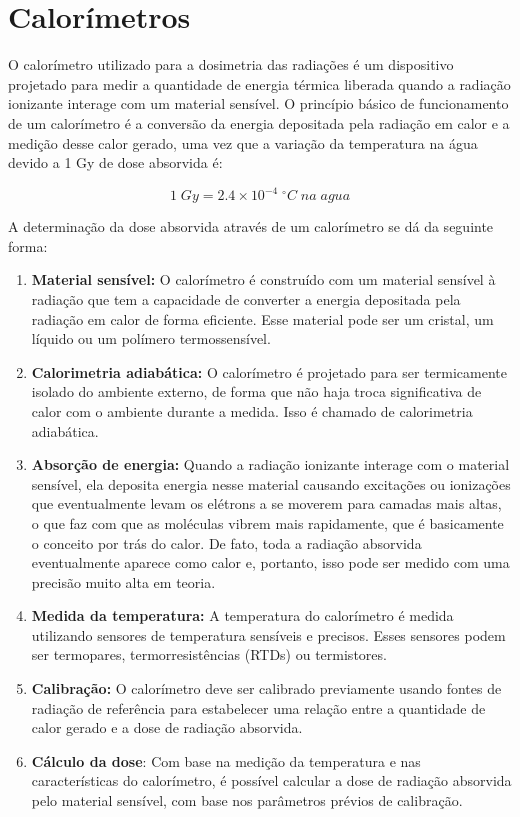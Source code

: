 \documentclass[11pt,a4paper]{article}
\begin{document}
	\section{Calorímetros}

		O calorímetro utilizado para a dosimetria das radiações é um dispositivo projetado para medir a quantidade de energia térmica liberada quando a radiação ionizante interage com um material sensível. O princípio básico de funcionamento de um calorímetro é a conversão da energia depositada pela radiação em calor e a medição desse calor gerado, uma vez que a variação da temperatura na água devido a 1 Gy de dose absorvida é:
		
			\begin{equation}
				1 \; Gy = 2.4 \times 10^{-4}\;{}^{\circ}C \; na \; agua
			\end{equation}

		A determinação da dose absorvida através de um calorímetro se dá da seguinte forma:

		\begin{enumerate}
			\item \textbf{Material sensível:} O calorímetro é construído com um material sensível à radiação que tem a capacidade de converter a energia depositada pela radiação em calor de forma eficiente. Esse material pode ser um cristal, um líquido ou um polímero termossensível.
			\item \textbf{Calorimetria adiabática:} O calorímetro é projetado para ser termicamente isolado do ambiente externo, de forma que não haja troca significativa de calor com o ambiente durante a medida. Isso é chamado de calorimetria adiabática.
			\item \textbf{Absorção de energia:} Quando a radiação ionizante interage com o material sensível, ela deposita energia nesse material causando excitações ou ionizações que eventualmente levam os elétrons a se moverem para camadas mais altas, o que faz com que as moléculas vibrem mais rapidamente, que é basicamente o conceito por trás do calor. De fato, toda a radiação absorvida eventualmente aparece como calor e, portanto, isso pode ser medido com uma precisão muito alta em teoria.
			\item \textbf{Medida da temperatura:} A temperatura do calorímetro é medida utilizando sensores de temperatura sensíveis e precisos. Esses sensores podem ser termopares, termorresistências (RTDs) ou termistores.
			\item \textbf{Calibração:} O calorímetro deve ser calibrado previamente usando fontes de radiação de referência para estabelecer uma relação entre a quantidade de calor gerado e a dose de radiação absorvida.
			\item \textbf{Cálculo da dose}: Com base na medição da temperatura e nas características do calorímetro, é possível calcular a dose de radiação absorvida pelo material sensível, com base nos parâmetros prévios de calibração. 
		\end{enumerate}
\end{document}
